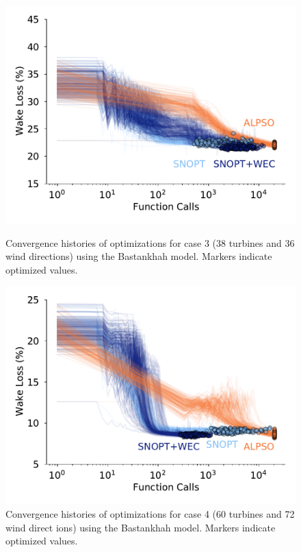 \documentclass{jpconf}
\begin{document}
\begin{figure}[h!]
	\centering
	\begin{minipage}[t]{.45\textwidth}
		\centering
		\includegraphics[width=\textwidth]{final_images/results/convergence_history_BPAmodel_38turbs_36dirs}  
		\caption{Convergence histories of optimizations for case 3 (38 turbines and 36 wind directions) using the Bastankhah model. Markers indicate optimized values.}
		\label{fig:case-3-histories}
	\end{minipage} \hspace{1pc}
	\begin{minipage}[t]{.45\textwidth}
		\centering
		\includegraphics[width=\textwidth]{final_images/results/convergence_history_BPAmodel_60turbs_72dirs}  
		\caption{Convergence histories of optimizations for case 4 (60 turbines and 72 wind direct          ions) using the Bastankhah model. Markers indicate optimized values.}
		\label{fig:case-4-histories}
	\end{minipage} 
\end{figure}
\end{document}
